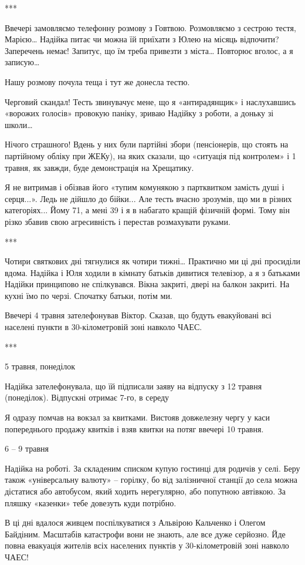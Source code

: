 ***

Ввечері замовляємо телефонну розмову з Говтвою. Розмовляємо з сестрою тестя,
Марією… Надійка питає чи можна їй приїхати з Юлею на місяць відпочити?
Заперечень немає! Запитує, що їм треба привезти з міста… Повторює вголос, а я
записую…

Нашу розмову почула теща і тут же донесла тестю. 

Черговий скандал! Тесть звинувачує мене, що я «антирадянщик» і наслухавшись
«ворожих голосів» провокую паніку, зриваю Надійку з роботи, а доньку зі школи… 

Нічого страшного! Вдень у них були партійні збори (пенсіонерів, що стоять на
партійному обліку при ЖЕКу), на яких сказали, що «ситуація під контролем» і 1
травня, як завжди, буде демонстрація на Хрещатику.

Я не витримав і обізвав його «тупим комунякою з партквитком замість душі і
серця...». Ледь не дійшло до бійки... Але тесть вчасно зрозумів, що ми в різних
категоріях... Йому 71, а мені 39 і я в набагато кращій фізичній формі. Тому він
різко збавив свою агресивність і перестав розмахувати руками. 

***

Чотири святкових дні тягнулися як чотири тижні… Практично ми ці дні просиділи
вдома. Надійка і Юля ходили в кімнату батьків дивитися телевізор, а я з
батьками Надійки принципово не спілкувався. Вікна закриті, двері на балкон
закриті. На кухні їмо по черзі. Спочатку батьки, потім ми.

Ввечері 4 травня зателефонував Віктор. Сказав, що будуть евакуйовані всі
населені пункти в 30-кілометровій зоні навколо ЧАЕС.

***

5 травня, понеділок

Надійка зателефонувала, що їй підписали заяву на відпуску з 12 травня
(понеділок). Відпускні отримає 7-го, в середу

Я одразу помчав на вокзал за квитками. Вистояв довжелезну чергу у каси
попереднього продажу квитків і взяв квитки на потяг ввечері 10 травня. 

6 – 9 травня

Надійка на роботі. За складеним списком купую гостинці для родичів у селі. Беру
також «універсальну валюту» – горілку, бо від залізничної станції до села можна
дістатися або автобусом, який ходить нерегулярно, або попутною автівкою. За
пляшку «казенки» тебе довезуть куди потрібно. 

В ці дні вдалося живцем поспілкуватися з Альвірою Кальченко і Олегом Байдіним.
Масштабів катастрофи вони не знають, але все дуже серйозно. Йде повна евакуація
жителів всіх населених пунктів у 30-кілометровій зоні навколо ЧАЕС!

